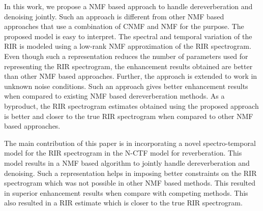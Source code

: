In this work, we propose a NMF based approach to handle dereverberation and denoising jointly. Such an approach is different from other NMF based approaches that use a combination of CNMF and NMF for the purpose. The proposed model is easy to interpret. The spectral and temporal variation of the RIR is modeled using a low-rank NMF approximation of the RIR spectrogram. Even though such a representation reduces the number of parameters used for representing the RIR spectrogram, the enhancement results obtained are better than other NMF based approaches. Further, the approach is extended to work in unknown noise conditions. Such an approach gives better enhancement results when compared to existing NMF based dereverberation methods. As a byproduct, the RIR spectrogram estimates obtained using the proposed approach is better and closer to the true RIR spectrogram when compared to other NMF based approaches.

The main contribution of this paper is in incorporating a novel spectro-temporal model for the RIR spectrogram in the N-CTF model for reverberation. This model results in a NMF based algorithm to jointly handle dereverberation and denoising. Such a representation helps in imposing better constraints on the RIR spectrogram which was not possible in other NMF based methods. This resulted in superior enhancement results when compare with competing methods.
This also resulted in a RIR estimate which is closer to the true RIR spectrogram.
\fi